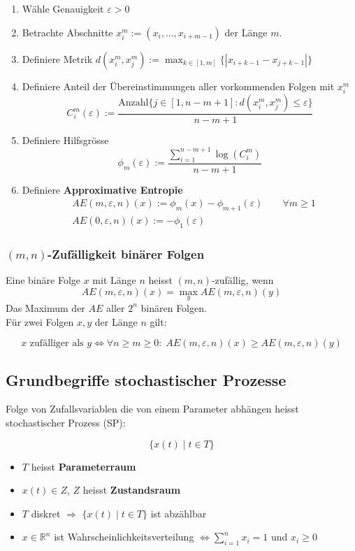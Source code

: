\documentclass[a4paper]{article}
\newcommand{\R}{\mathbb{R}}
\begin{document}
\begin{enumerate}
	\item Wähle Genauigkeit $\varepsilon > 0$
	\item Betrachte Abschnitte $x_{i} ^{m} := (x_{i}, ..., x_{i+m-1})$
		der Länge $m$.
	\item Definiere Metrik 
		$d(x_{i} ^{m}, x_{j} ^{m}) := \max_{k\in [1, m]} \{
			| x_{i+k-1} - x_{j+k-1} |
		\} $
	\item Definiere Anteil der Übereinstimmungen 
		aller vorkommenden Folgen
		mit $x_{i} ^{m}$
		\[
			C_{i} ^{m} (\varepsilon)
			:= \frac{ 
				\text{Anzahl} \{
					j \in [1, n-m+1]:
					d \left(
						x_{i} ^{m}, x_{j} ^{m}
					\right) \leq \varepsilon
				\} 
			}{ n - m + 1 }
		\]
	\item Definiere Hilfsgrösse
		\[
			\phi_m (\varepsilon)
			:=
			\frac{ \sum_{i=1}^{n-m+1} \log (C_i ^{m}) }{ n-m+1 }
		\] 
	\item Definiere \textbf{Approximative Entropie}
		\begin{align*}
			& AE (m, \varepsilon, n) (x) := 
			\phi_m (x) - \phi_{m+1} (\varepsilon)
			\qquad \forall m \geq 1
			\\
			& AE(0, \varepsilon, n) (x) :=
			- \phi_1 (\varepsilon)
		\end{align*}
\end{enumerate}

\subsubsection*{$(m,n)$-Zufälligkeit binärer Folgen}
Eine binäre Folge $x$ mit Länge $n$ heisst $(m,n)$-zufällig, wenn
\[
	AE(m, \varepsilon, n) (x) = \max_{y} AE(m, \varepsilon, n)(y)
\] 
Das Maximum der $AE$ aller $2^{n}$ binären Folgen.
\\

Für zwei Folgen $x, y$ der Länge $n$ gilt:

\[
x \text{ zufälliger als } y 
\Leftrightarrow
\forall n \geq m \geq 0: \;
AE(m, \varepsilon, n) (x) \geq
AE(m, \varepsilon, n) (y)
\] 

\subsection{Grundbegriffe stochastischer Prozesse}
Folge von Zufallsvariablen die von einem Parameter
abhängen heisst stochastischer Prozess (SP):

\[
\{
	x(t) \; \vert \; t \in T
\} 
\] 

\begin{itemize}
	\item $T$ heisst \textbf{Parameterraum} 
	\item $x(t) \in Z$, $Z$ heisst \textbf{Zustandsraum} 
	\item $T$ diskret $\Rightarrow$ $\{
			x(t) \; \vert \; t \in T
	\} $ ist abzählbar
	\item $x \in \R ^{n}$ ist Wahrscheinlichkeitsverteilung
		$\Leftrightarrow \sum_{i=1}^{n} x_{i} = 1$
		und $x_{i} \geq 0$
\end{itemize}
\end{document}
